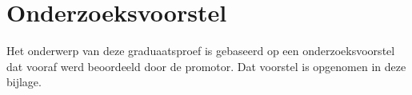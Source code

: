 \documentclass[dutch,dit,thesis]{hogentreport}
\begin{document}





%
%




\appendix

\chapter{Onderzoeksvoorstel}

Het onderwerp van deze graduaatsproef is gebaseerd op een onderzoeksvoorstel dat vooraf werd beoordeeld door de promotor. Dat voorstel is opgenomen in deze bijlage.





%


\backmatter{}

\setlength\bibitemsep{2pt} %
\printbibliography[heading=bibintoc]
\end{document}
